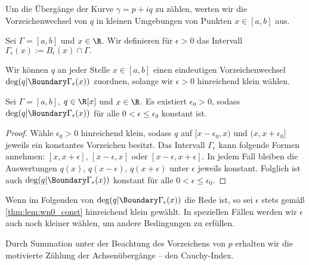 \documentclass{mythesis}
\begin{document}
Um die Übergänge der Kurve $\gamma = p + iq$ zu zählen, werten wir die Vorzeichenwechsel von $q$ in kleinen Umgebungen von Punkten $x \in [a,b]$ aus.

\begin{definition} \label{thm:def:gamma1_eps}
    Sei $\Gamma = [a,b]$ und $x \in \R$.
    Wir definieren für $\epsilon > 0$ das Intervall
    \begin{math}
        \Gamma_\epsilon(x) := B_\epsilon(x) \cap \Gamma.
    \end{math}
\end{definition}

Wir können $q$ an jeder Stelle $x \in [a,b]$ einen eindeutigen Vorzeichenwechsel $\deg(q|\Boundary\Gamma_\epsilon(x))$ zuordnen, solange wir $\epsilon > 0$ hinreichend klein wählen.

\begin{lemma} \label{thm:lem:wn0_const}
    Sei $\Gamma = [a,b]$, $q \in \R[x]$ und $x \in \R$.
    Es existiert $\epsilon_0 > 0$, sodass $\deg(q|\Boundary\Gamma_\epsilon(x))$ für alle $0 < \epsilon \le \epsilon_0$ konstant ist.
    \begin{proof}
        Wähle $\epsilon_0 > 0$ hinreichend klein, sodass $q$ auf $[x-\epsilon_0, x)$ und $(x, x+\epsilon_0]$ jeweils ein konstantes Vorzeichen besitzt.
        Das Intervall $\Gamma_\epsilon$ kann folgende Formen annehmen: $[x, x+\epsilon]$, $[x-\epsilon, x]$ oder $[x-\epsilon, x+\epsilon]$.
        In jedem Fall bleiben die Auswertungen $q(x)$, $q(x-\epsilon)$, $q(x+\epsilon)$ unter $\epsilon$ jeweils konstant.
        Folglich ist auch $\deg(q|\Boundary\Gamma_\epsilon(x))$ konstant für alle $0 < \epsilon \le \epsilon_0$.
    \end{proof}
\end{lemma}

Wenn im Folgenden von $\deg(q|\Boundary\Gamma_\epsilon(x))$ die Rede ist, so sei $\epsilon$ stets gemäß \ref{thm:lem:wn0_const} hinreichend klein gewählt.
In speziellen Fällen werden wir $\epsilon$ auch noch kleiner wählen, um andere Bedingungen zu erfüllen.

Durch Summation unter der Beachtung des Vorzeichens von $p$ erhalten wir die motivierte Zählung der Achsenübergänge – den Cauchy-Index.
\end{document}

